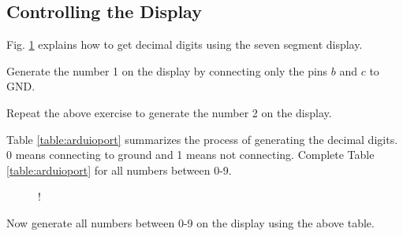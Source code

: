 \subsection{Controlling the Display}
Fig. \ref{fig:sevenseg12} explains how to get decimal digits using the seven segment display. 
\begin{problem}
	Generate the number 1 on the display by connecting only the pins $b$ and $c$ to GND. 
\end{problem}	
\begin{problem}
	Repeat the above exercise to generate the number 2 on the display.
\end{problem}	
%
\begin{problem}
Table \ref{table:arduioport} summarizes the process of generating the decimal digits.  0 means connecting to ground and 1 means not connecting.  	Complete Table \ref{table:arduioport} for all numbers between 0-9.
\end{problem}	

%
%
\begin{figure}[!h]
\begin{center}
 {!} {

}
\end{center}
\caption{}
\label{fig:sevenseg12}
\end{figure}
%
\begin{problem}
	Now generate all numbers between  0-9 on the display using the above table.
\end{problem}
%
%
